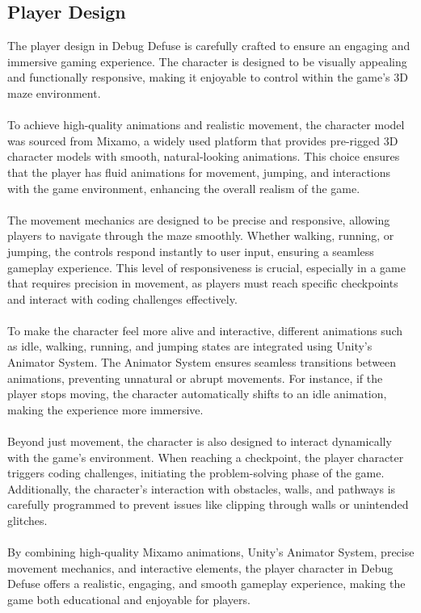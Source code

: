 \subsection{Player Design}
\medskip
The player design in Debug Defuse is carefully crafted to ensure an engaging and immersive gaming experience. The character is designed to be visually appealing and functionally responsive, making it enjoyable to control within the game’s 3D maze environment.\\\\
\noindent
To achieve high-quality animations and realistic movement, the character model was sourced from Mixamo, a widely used platform that provides pre-rigged 3D character models with smooth, natural-looking animations. This choice ensures that the player has fluid animations for movement, jumping, and interactions with the game environment, enhancing the overall realism of the game.\\\\
\noindent
The movement mechanics are designed to be precise and responsive, allowing players to navigate through the maze smoothly. Whether walking, running, or jumping, the controls respond instantly to user input, ensuring a seamless gameplay experience. This level of responsiveness is crucial, especially in a game that requires precision in movement, as players must reach specific checkpoints and interact with coding challenges effectively.\\\\  
\noindent
To make the character feel more alive and interactive, different animations such as idle, walking, running, and jumping states are integrated using Unity’s Animator System. The Animator System ensures seamless transitions between animations, preventing unnatural or abrupt movements. For instance, if the player stops moving, the character automatically shifts to an idle animation, making the experience more immersive.\\\\  
\noindent
Beyond just movement, the character is also designed to interact dynamically with the game’s environment. When reaching a checkpoint, the player character triggers coding challenges, initiating the problem-solving phase of the game. Additionally, the character’s interaction with obstacles, walls, and pathways is carefully programmed to prevent issues like clipping through walls or unintended glitches.\\\\  
\noindent
By combining high-quality Mixamo animations, Unity’s Animator System, precise movement mechanics, and interactive elements, the player character in Debug Defuse offers a realistic, engaging, and smooth gameplay experience, making the game both educational and enjoyable for players.
